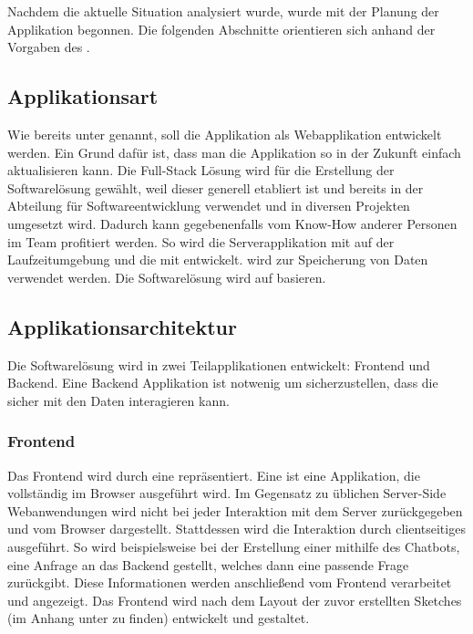 Nachdem die aktuelle Situation analysiert wurde, wurde mit der Planung der Applikation begonnen. Die folgenden Abschnitte orientieren sich anhand der Vorgaben des .

\subsection{Applikationsart}

Wie bereits unter  genannt, soll die Applikation als Webapplikation entwickelt werden. Ein Grund dafür ist, dass man die Applikation so in der Zukunft
einfach aktualisieren kann. Die Full-Stack Lösung  wird für die Erstellung der Softwarelösung gewählt, weil dieser generell etabliert ist und bereits in der Abteilung für Softwareentwicklung verwendet und in diversen Projekten umgesetzt wird. Dadurch kann gegebenenfalls vom Know-How anderer Personen im Team profitiert werden. So wird die Serverapplikation mit  auf der Laufzeitumgebung  und die  mit  entwickelt. wird zur Speicherung von Daten verwendet werden. Die Softwarelösung wird auf  basieren.

\subsection{Applikationsarchitektur}
\label{sec:Planungsphase:Applikationsarchitektur}

Die Softwarelösung wird in zwei Teilapplikationen entwickelt: Frontend und Backend. Eine Backend Applikation ist notwenig um sicherzustellen, dass die  sicher mit den Daten interagieren kann.

\subsubsection{Frontend}
\label{sec:Planungsphase:Frontend}

Das Frontend wird durch eine  repräsentiert. Eine  ist eine Applikation, die vollständig im Browser ausgeführt wird.  Im Gegensatz zu üblichen Server-Side Webanwendungen wird nicht bei jeder Interaktion mit dem Server  zurückgegeben und vom Browser dargestellt. Stattdessen wird die Interaktion durch clientseitiges  ausgeführt. 
So wird beispielsweise bei der Erstellung einer  mithilfe des Chatbots, eine Anfrage an das Backend gestellt, welches dann eine passende Frage zurückgibt. Diese Informationen werden anschließend vom Frontend verarbeitet und angezeigt.
Das Frontend wird nach dem Layout der zuvor erstellten Sketches (im Anhang unter  zu finden) entwickelt und gestaltet. 


